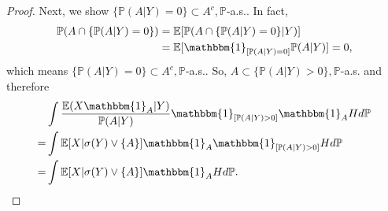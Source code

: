 \documentclass[12pt]{article}
\renewcommand{\(}{\left(}%
\renewcommand{\)}{\right)}%
\renewcommand{\[}{\left[}%
\renewcommand{\]}{\right]}%
\newcommand{\p}{\mathbb{P}}
\newtheorem{proof}{Proof.}}
\begin{document}
\begin{proof}
  	Next, we show $\{\p(A|Y)=0\}\subset A^c,\p$-a.s.. In fact,
  	\begin{equation*}
  		\begin{split}
  			\p(A\cap \{\p(A|Y)=0\})&=\mathbb{E}[\p(A\cap \{\p(A|Y)=0\}|Y)]\\
  			&=\mathbb{E}[\mathbbm{1}_{[\p(A|Y)=0]}\p(A|Y)]=0,
  		\end{split}
  	\end{equation*}
  	which means $\{\p(A|Y)=0\}\subset A^c,\p$-a.s.. So, $A\subset \{\p(A|Y)>0\},\p$-a.s. and therefore
  	\begin{equation*}
  		\begin{split}
  			&\int \frac{\mathbb{E}(X\mathbbm{1}_A|Y)}{\p(A|Y)}\mathbbm{1}_{[\p(A|Y)>0]}\mathbbm{1}_AHd\p\\
  			=&\int \mathbb{E}[X|\sigma(Y) \vee \{A\}]\mathbbm{1}_A\mathbbm{1}_{[\p(A|Y)>0]}Hd\p\\
  			=&\int \mathbb{E}[X|\sigma(Y) \vee \{A\}]\mathbbm{1}_AHd\p.
  		\end{split}
  	\end{equation*}
  \end{proof}
  
\end{document}
